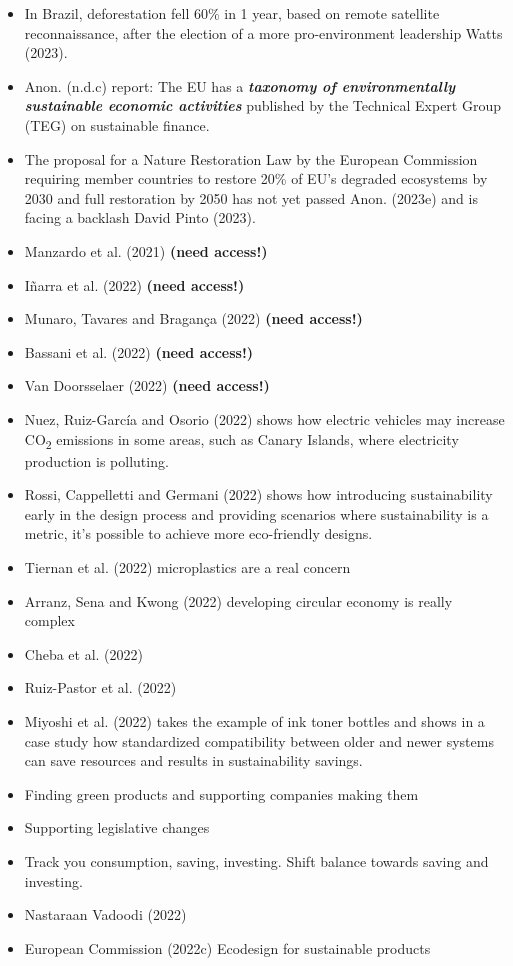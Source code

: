 \documentclass[
  letterpaper,
  DIV=11,
  numbers=noendperiod]{scrartcl}
\begin{document}
\begin{itemize}
\item
  In Brazil, deforestation fell 60\% in 1 year, based on remote
  satellite reconnaissance, after the election of a more pro-environment
  leadership Watts (2023).
\item
  Anon. (n.d.c) report: The EU has a \textbf{\emph{taxonomy of
  environmentally sustainable economic activities}} published by the
  Technical Expert Group (TEG) on sustainable finance.
\item
  The proposal for a Nature Restoration Law by the European Commission
  requiring member countries to restore 20\% of EU's degraded ecosystems
  by 2030 and full restoration by 2050 has not yet passed Anon. (2023e)
  and is facing a backlash David Pinto (2023).
\item
  Manzardo et al. (2021) \textbf{(need access!)}
\item
  Iñarra et al. (2022) \textbf{(need access!)}
\item
  Munaro, Tavares and Bragança (2022) \textbf{(need access!)}
\item
  Bassani et al. (2022) \textbf{(need access!)}
\item
  Van Doorsselaer (2022) \textbf{(need access!)}
\item
  Nuez, Ruiz-García and Osorio (2022) shows how electric vehicles may
  increase CO\textsubscript{2} emissions in some areas, such as Canary
  Islands, where electricity production is polluting.
\item
  Rossi, Cappelletti and Germani (2022) shows how introducing
  sustainability early in the design process and providing scenarios
  where sustainability is a metric, it's possible to achieve more
  eco-friendly designs.
\item
  Tiernan et al. (2022) microplastics are a real concern
\item
  Arranz, Sena and Kwong (2022) developing circular economy is really
  complex
\item
  Cheba et al. (2022)
\item
  Ruiz-Pastor et al. (2022)
\item
  Miyoshi et al. (2022) takes the example of ink toner bottles and shows
  in a case study how standardized compatibility between older and newer
  systems can save resources and results in sustainability savings.
\item
  Finding green products and supporting companies making them
\item
  Supporting legislative changes
\item
  Track you consumption, saving, investing. Shift balance towards saving
  and investing.
\item
  Nastaraan Vadoodi (2022)
\item
  European Commission (2022c) Ecodesign for sustainable products
\end{itemize}
\end{document}

